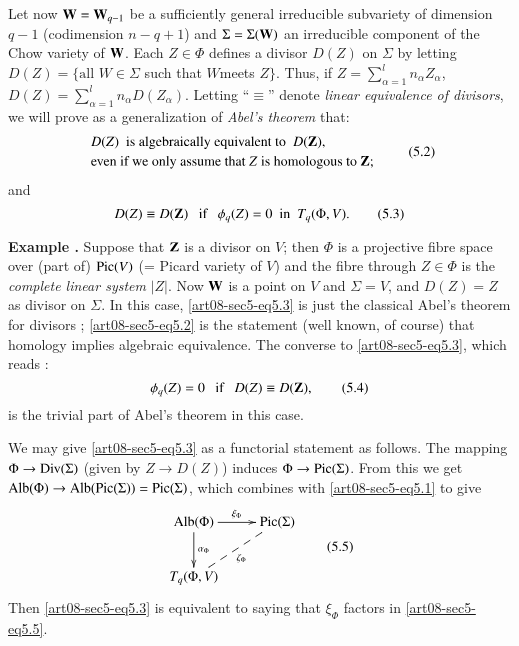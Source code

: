 \eject

Let now $\mathbf{W}=\mathbf{W}_{q-1}$ be a sufficiently general irreducible subvariety of dimension $q-1$ (codimension $n-q+1$) and $\Sigma=\Sigma(\mathbf{W})$ an irreducible component of the Chow variety of $\mathbf{W}$. Each $Z\in \Phi$ defines a divisor $D(Z)$ on $\Sigma$ by letting $D(Z)=\{\text{all~}W\in \Sigma$ such that $W$\pageoriginale meets $Z\}$. Thus, if $Z=\sum\limits^{l}_{\alpha=1}n_{\alpha}Z_{\alpha}$, $D(Z)=\sum\limits^{l}_{\alpha=1}n_{\alpha}D(Z_{\alpha})$. Letting ``$\equiv$'' denote {\em linear equivalence of divisors}, we will prove as a generalization of {\em Abel's theorem} that:
\begin{equation*}
\begin{array}{l}
D(Z)\text{~ is algebraically equivalent to~ } D(\mathbf{Z}),\\[2pt]
\text{even if we only assume that $Z$ is homologous to $\mathbf{Z}$};
\end{array}\tag{5.2}\label{art08-sec5-eq5.2}
\end{equation*}
and
\begin{equation*}
D(Z)\equiv D(\mathbf{Z})\text{~~ if~~ }\phi_{q}(Z)=0\text{~ in~ }T_{q}(\Phi,V).\tag{5.3}\label{art08-sec5-eq5.3}
\end{equation*}

\medskip
\noindent
{\bf Example .\label{art08-sec5-exam1}}
Suppose that $\mathbf{Z}$ is a divisor on $V$; then $\Phi$ is a projective fibre space over (part of) $\operatorname{\mathrm{Pic}}(V)$ (= Picard variety of $V$) and the fibre through $Z\in \Phi$ is the {\em complete linear system} $|Z|$. Now $\mathbf{W}$ is a point on $V$ and $\Sigma=V$, and $D(Z)=Z$ as divisor on $\Sigma$. In this case, \eqref{art08-sec5-eq5.3} is just the classical Abel's theorem for divisors \cite{art08-key17}; \eqref{art08-sec5-eq5.2} is the statement (well known, of course) that homology implies algebraic equivalence. The converse to \eqref{art08-sec5-eq5.3}, which reads :
\begin{equation*}
\phi_{q}(Z)=0\text{~~ if~~ } D(Z)\equiv D(\mathbf{Z}),\tag{5.4}\label{art08-sec5-eq5.4}
\end{equation*}
is the trivial part of Abel's theorem in this case.

\begin{remark*}
We may give \eqref{art08-sec5-eq5.3} as a functorial statement as follows. The mapping $\Phi\to \operatorname{\mathrm{Div}}(\Sigma)$ (given by $Z\to D(Z)$) induces $\Phi\to \operatorname{\mathrm{Pic}}(\Sigma)$. From this we get $\operatorname{\mathrm{Alb}}(\Phi)\to \operatorname{\mathrm{Alb}}(\operatorname{\mathrm{Pic}}(\Sigma))=\operatorname{\mathrm{Pic}}(\Sigma)$, which combines with \eqref{art08-sec5-eq5.1} to give
\begin{equation*}
\vcenter{\xymatrix{
\Alb(\Phi)\ar[d]^-{\alpha_{\Phi}}\ar[r]^-{\xi_{\Phi}} & \Pic(\Sigma)\\
T_{q}(\Phi,V)\ar@{--}[ur]_{\zeta_{\Phi}} &
}}\tag{5.5}\label{art08-sec5-eq5.5}
\end{equation*}
Then \eqref{art08-sec5-eq5.3} is equivalent to saying that $\xi_{\Phi}$ factors in \eqref{art08-sec5-eq5.5}.
\end{remark*}

